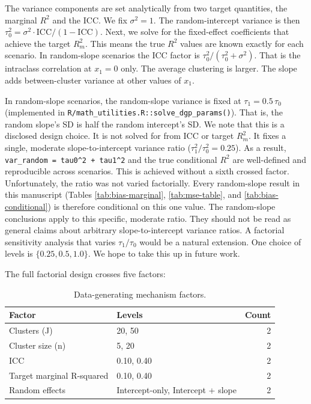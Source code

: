\documentclass[
  11pt,
]{article}
\begin{document}
The variance components are set analytically from two target
quantities, the marginal \(R^2\) and the ICC. We fix
\(\sigma^2 = 1\). The random-intercept variance is then
\(\tau_0^2 = \sigma^2 \cdot \text{ICC} / (1 - \text{ICC})\).
Next, we solve for the fixed-effect coefficients that achieve the
target \(R^2_m\). This means the true \(R^2\) values are known exactly
for each scenario. In random-slope scenarios the ICC factor is
\(\tau_0^2/(\tau_0^2 + \sigma^2)\). That is the intraclass
correlation at \(x_1 = 0\) only. The average clustering is larger.
The slope adds between-cluster variance at other values of
\(x_1\).

In random-slope scenarios, the random-slope variance is fixed at
\(\tau_1 = 0.5 \, \tau_0\) (implemented in
\texttt{R/math\_utilities.R::solve\_dgp\_params()}). That is, the random
slope's SD is half the random intercept's SD. We note that this
is a disclosed design choice. It is not solved for from ICC or
target \(R^2_m\). It fixes a single, moderate slope-to-intercept
variance ratio (\(\tau_1^2 / \tau_0^2 = 0.25\)). As a result,
\texttt{var\_random\ =\ tau0\^{}2\ +\ tau1\^{}2} and the true conditional \(R^2\) are
well-defined and reproducible across scenarios. This is achieved
without a sixth crossed factor. Unfortunately, the ratio was not
varied factorially. Every random-slope result in this manuscript
(Tables \ref{tab:bias-marginal}, \ref{tab:mse-table}, and
\ref{tab:bias-conditional}) is therefore conditional on this one
value. The random-slope conclusions apply to this specific,
moderate ratio. They should not be read as general claims about
arbitrary slope-to-intercept variance ratios. A factorial
sensitivity analysis that varies \(\tau_1/\tau_0\) would be a
natural extension. One choice of levels is
\(\{0.25, 0.5, 1.0\}\). We hope to take this up in future work.

The full factorial design crosses five factors:

\begin{table}[!h]
\centering
\caption{\label{tab:dgp-factors}Data-generating mechanism factors.}
\centering
\begin{tabular}[t]{llr}
\toprule
Factor & Levels & Count\\
\midrule
Clusters (J) & 20, 50 & 2\\
Cluster size (n) & 5, 20 & 2\\
ICC & 0.10, 0.40 & 2\\
Target marginal R-squared & 0.10, 0.40 & 2\\
Random effects & Intercept-only, Intercept + slope & 2\\
\bottomrule
\end{tabular}
\end{table}
\end{document}
